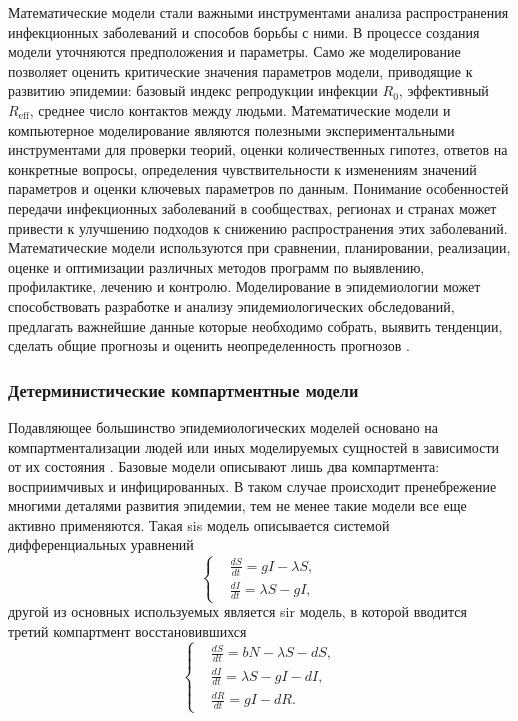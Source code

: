 \documentclass[a4paper,12pt]{article} %
\begin{document}
Математические модели стали важными инструментами анализа распространения инфекционных заболеваний и способов борьбы с ними. В процессе создания модели уточняются предположения и параметры. Само же моделирование позволяет оценить критические значения параметров модели, приводящие к развитию эпидемии: базовый индекс репродукции инфекции $R_0$, эффективный $R_{\text{eff}}$, среднее число контактов между людьми. Математические модели и компьютерное моделирование являются полезными экспериментальными инструментами для проверки теорий, оценки количественных гипотез, ответов на конкретные вопросы, определения чувствительности к изменениям значений параметров и оценки ключевых параметров по данным. Понимание особенностей передачи инфекционных заболеваний в сообществах, регионах и странах может привести к улучшению подходов к снижению распространения этих заболеваний. Математические модели используются при сравнении, планировании, реализации, оценке и оптимизации различных методов
программ по выявлению, профилактике, лечению и контролю. Моделирование в эпидемиологии может способствовать разработке и анализу эпидемиологических обследований, предлагать важнейшие данные которые необходимо собрать, выявить тенденции, сделать общие прогнозы и оценить неопределенность прогнозов \cite{hethcote2000mathematics, hethcote1989three,hethcote1992transmission}.

\subsubsection{Детерминистические компартментные модели}

Подавляющее большинство эпидемиологических моделей основано на компартментализации людей или иных моделируемых сущностей в зависимости от их состояния \cite{keeling2005networks,kermack1927contribution,bailey1957mathematical,anderson1992may}. Базовые модели описывают лишь два компартмента: восприимчивых и инфицированных. В таком случае происходит пренебрежение многими деталями развития эпидемии, тем не менее такие модели все еще активно применяются. Такая \gls{sis} модель описывается системой дифференциальных уравнений
\begin{equation}
    \left\{
    \begin{aligned}
        & \frac{dS}{dt} = gI-\lambda S, \\
        & \frac{dI}{dt} = \lambda S - gI,
    \end{aligned}
    \right.
\end{equation}
другой из основных используемых является \gls{sir} модель, в которой вводится третий компартмент восстановившихся
\begin{equation}
    \left\{
    \begin{aligned}
    & \frac{dS}{dt}=bN-\lambda S-dS, \\
    & \frac{dI}{dt}=\lambda S-gI-dI, \\
    & \frac{dR}{dt}=gI-dR.
    \end{aligned}
    \right.
\end{equation}
\end{document}
